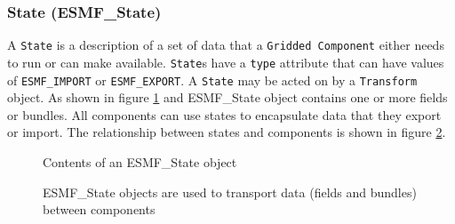\subsubsection{State (ESMF\_State)}
A {\tt State} is a description of a set of data that a 
{\tt Gridded Component} either needs to run or can make available.  
{\tt State}s
have a {\tt type} attribute that can have values of {\tt ESMF\_IMPORT} or
{\tt ESMF\_EXPORT}.  A {\tt State} may be acted on by a {\tt Transform} object.
As shown in figure \ref{fig:ESMFStateDiagram} and ESMF\_State object contains 
one or more fields or bundles. All components can use states to encapsulate 
data that they export or import. The relationship between states and 
components is shown in figure \ref{fig:ESMFSystemDiagram}.

\begin{figure}
\caption[{ESMF State Contents}]{Contents of an ESMF\_State object}
\label{fig:ESMFStateDiagram}
\end{figure}

\begin{figure}
\caption[{ESMF State Role}]{ESMF\_State objects are used to transport data
(fields and bundles) between components}
\label{fig:ESMFSystemDiagram}
\end{figure}

